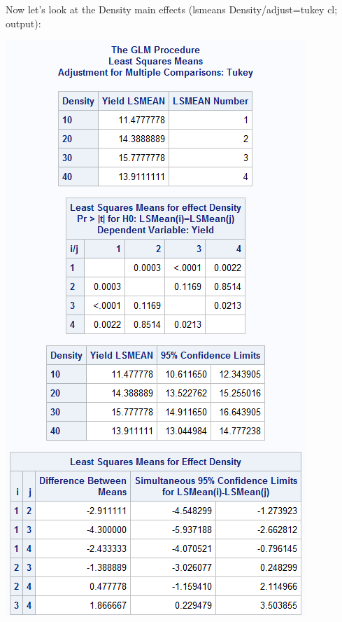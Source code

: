 \newpage

Now let's look at the Density main effects (lsmeans Density/adjust=tukey cl; output):
\begin{flushleft}
\includegraphics[scale=0.7]{Tomato4}
\end{flushleft}


\newpage

